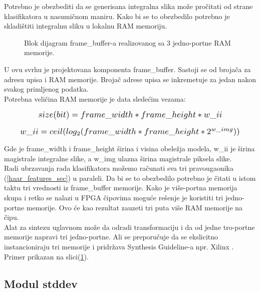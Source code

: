 Potrebno je obezbediti da se generisana integralna slika može pročitati od
strane klasifikatora u nasumičnom maniru.
Kako bi se to obezbedilo potrebno je skladištiti integralnu sliku u lokalnu RAM
memoriju. \\

\begin{figure}[H]
  \centering
  \scalebox{1.0}{
    
    }
\caption{Blok dijagram frame\_buffer-a realizovanog sa 3 jedno-portne RAM memorije.}
\label{frame_buffer_bd}
\end{figure}

U ovu svrhu je projektovana komponenta frame\_buffer.
Sastoji se od brojača za adresu upisa i RAM memorije.
Brojač adrese upisa se inkremetuje za jedan nakon svakog primljenog podatka. \\
Potrebna veličina RAM memorije je data sledećim vezama:

\begin{equation}
  \Scale[1.2]{ size(bit) = frame\_width * frame\_height * w\_ii}
  \label{frame_buffer_eq1}
\end{equation}

\begin{equation}
  \Scale[1.2]{ w\_ii = ceil(log_2(frame\_width * frame\_height * 2^{w\_img}))}
  \label{frame_buffer_eq2}
\end{equation}

Gde je frame\_width i frame\_height širina i visina obeležja modela, w\_ii je
širina magistrale integralne slike, a w\_img ulazna širina magistrale piksela
slike. \\

Radi ubrzavanja rada klasifikatora možemo računati sva tri pravougaonika (\ref{haar_features_sec}) u paraleli.
Da bi se to obezbedilo potrebno je čitati u istom taktu tri vrednosti iz
frame\_buffer memorije.
Kako je više-portna memorija skupa i retko se nalazi u FPGA čipovima moguće
rešenje je koristiti tri jedno-portne memorije.
Ovo će kao rezultat zauzeti tri puta više RAM memorije na čipu.\\

Alat za sintezu uglavnom može da odradi transformaciju i da od jedne tro-portne
memorije napravi tri jedno-portne.
Ali se preporučuje da se ekslicitno instancioniraju tri memorije i pridržava
Synthesis Guideline-a npr. Xilinx \cite{XST}. \\
Primer prikazan na slici(\ref{frame_buffer_bd}).

\subsection{Modul stddev}

